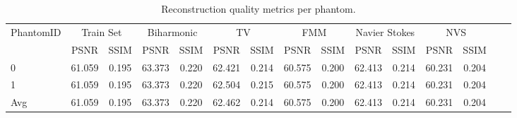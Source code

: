 \begin{table}
\caption{Reconstruction quality metrics per phantom.}
\label{tab:phantom_metrics}
\begin{tabular}{|lcc|cc|cc|cc|cc|cc|cc|}
\toprule
PhantomID & \multicolumn{2}{c}{Train Set} & \multicolumn{2}{c}{Biharmonic} & \multicolumn{2}{c}{TV} & \multicolumn{2}{c}{FMM} & \multicolumn{2}{c}{Navier Stokes} & \multicolumn{2}{c}{NVS} \\
 & PSNR & SSIM & PSNR & SSIM & PSNR & SSIM & PSNR & SSIM & PSNR & SSIM & PSNR & SSIM \\
\midrule
0 & 61.059 & 0.195 & 63.373 & 0.220 & 62.421 & 0.214 & 60.575 & 0.200 & 62.413 & 0.214 & 60.231 & 0.204 \\
1 & 61.059 & 0.195 & 63.373 & 0.220 & 62.504 & 0.215 & 60.575 & 0.200 & 62.413 & 0.214 & 60.231 & 0.204 \\
Avg & 61.059 & 0.195 & 63.373 & 0.220 & 62.462 & 0.214 & 60.575 & 0.200 & 62.413 & 0.214 & 60.231 & 0.204 \\
\bottomrule
\end{tabular}
\end{table}
